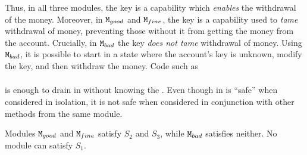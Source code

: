 \begin{example}
{Thus, in all three modules, the key is a capability which \emph{enables} the withdrawal of the money. 
Moreover, in $\mbox{\normalfont{\texttt{M}}}_{{good}}$ and $\mbox{\normalfont{\texttt{M}}}_{{fine}}$, the key
{is a capability} used to  \emph{tame} withdrawal of money, preventing those without it from getting the money from the account.}
Crucially,  in $\mbox{\normalfont{\texttt{M}}}_{{bad}}$ the key \emph{does not tame} withdrawal of money.
Using $\mbox{\normalfont{\texttt{M}}}_{{bad}}$, it is possible to start in a state where the account's key is unknown, modify the key, and then withdraw the money. 
Code  {such as}
\\ 
$\ \strut \hspace{.2in} $  
\\ 
is enough to drain   in \ModB without knowing the \password.
Even though %
 in  \ModB is ``safe'' when considered in isolation, it is not safe when considered in conjunction with other methods from the same module. 

Modules $\mbox{\normalfont{\texttt{M}}}_{{good}}$ and $\mbox{\normalfont{\texttt{M}}}_{{fine}}$ satisfy $S_2$ and $S_3$, while $\mbox{\normalfont{\texttt{M}}}_{{bad}}$ satisfies neither. No module can satisfy $S_1$. 
\end{example}
 


